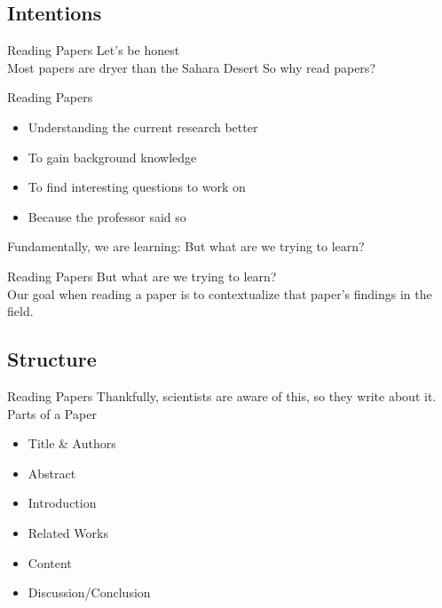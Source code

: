 \documentclass[aspectratio=169,xcolor=dvipsnames]{beamer}
\begin{document}
\subsection{Intentions}
\begin{frame}{Reading Papers}
	Let's be honest\\Most papers are dryer than the Sahara Desert\pause
	\newline
	\newline
	So why read papers?
\end{frame}
\begin{frame}{Reading Papers}
	\begin{itemize}
		\item Understanding the current research better \pause
		\item To gain background knowledge \pause
		\item To find interesting questions to work on \pause
		\item Because the professor said so \pause
	\end{itemize}
	Fundamentally, we are learning: But what are we trying to learn?
\end{frame}
\begin{frame}{Reading Papers}
	But what are we trying to learn?\\\pause
	Our goal when reading a paper is to contextualize that paper's findings in the field.
\end{frame}
\subsection{Structure}
\begin{frame}{Reading Papers}
	Thankfully, scientists are aware of this, so they write about it.\pause
	\\Parts of a Paper
	\begin{itemize}
		\item Title \& Authors \pause
		\item Abstract \pause
		\item Introduction \pause
		\item Related Works \pause
		\item Content\pause
		\item Discussion/Conclusion
	\end{itemize}
\end{frame}
\end{document}
